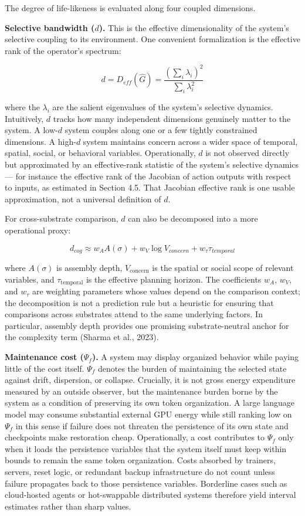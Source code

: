 \documentclass[Afour,sageh,times,doublespace]{sagej}
\begin{document}
The degree of life-likeness is evaluated along four coupled dimensions.

\textbf{Selective bandwidth (\(d\)).} This is the effective dimensionality of the system's selective coupling to its environment. One convenient formalization is the effective rank of the operator's spectrum:

\[
d = D_{eff}(\hat{G}) = \frac{(\sum_i \lambda_i)^2}{\sum_i \lambda_i^2}
\]

where the \(\lambda_i\) are the salient eigenvalues of the system's selective dynamics. Intuitively, \(d\) tracks how many independent dimensions genuinely matter to the system. A low-\(d\) system couples along one or a few tightly constrained dimensions. A high-\(d\) system maintains concern across a wider space of temporal, spatial, social, or behavioral variables. Operationally, \(d\) is not observed directly but approximated by an effective-rank statistic of the system's selective dynamics --- for instance the effective rank of the Jacobian of action outputs with respect to inputs, as estimated in Section 4.5. That Jacobian effective rank is one usable approximation, not a universal definition of \(d\).

For cross-substrate comparison, \(d\) can also be decomposed into a more operational proxy:

\[
d_{cog} \approx w_A A(\sigma) + w_V \log V_{concern} + w_\tau \tau_{temporal}
\]

where \(A(\sigma)\) is assembly depth, \(V_{\mathrm{concern}}\) is the spatial or social scope of relevant variables, and \(\tau_{\mathrm{temporal}}\) is the effective planning horizon. The coefficients \(w_A\), \(w_V\), and \(w_\tau\) are weighting parameters whose values depend on the comparison context; the decomposition is not a prediction rule but a heuristic for ensuring that comparisons across substrates attend to the same underlying factors. In particular, assembly depth provides one promising substrate-neutral anchor for the complexity term (Sharma et al., 2023).

\textbf{Maintenance cost (\(\Psi_f\)).} A system may display organized behavior while paying little of the cost itself. \(\Psi_f\) denotes the burden of maintaining the selected state against drift, dispersion, or collapse. Crucially, it is not gross energy expenditure measured by an outside observer, but the maintenance burden borne by the system as a condition of preserving its own token organization. A large language model may consume substantial external GPU energy while still ranking low on \(\Psi_f\) in this sense if failure does not threaten the persistence of its own state and checkpoints make restoration cheap. Operationally, a cost contributes to \(\Psi_f\) only when it loads the persistence variables that the system itself must keep within bounds to remain the same token organization. Costs absorbed by trainers, servers, reset logic, or redundant backup infrastructure do not count unless failure propagates back to those persistence variables. Borderline cases such as cloud-hosted agents or hot-swappable distributed systems therefore yield interval estimates rather than sharp values.
\end{document}
